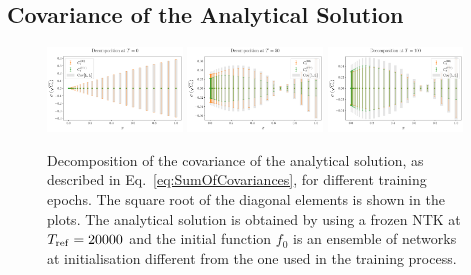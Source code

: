 \FloatBarrier

\subsection{Covariance of the Analytical Solution}
\label{sec:CovarianceAnlyticalSolution}


\begin{figure}[ht!]
  \centering
  \includegraphics[width=0.32\textwidth]{plots/analytical_solution/xT3/covariance/diagonal/decomposition/L0/linear/diag_error_decomposition_epoch_0_L0_linear.pdf}
  \includegraphics[width=0.32\textwidth]{plots/analytical_solution/xT3/covariance/diagonal/decomposition/L0/linear/diag_error_decomposition_epoch_50_L0_linear.pdf}
  \includegraphics[width=0.32\textwidth]{plots/analytical_solution/xT3/covariance/diagonal/decomposition/L0/linear/diag_error_decomposition_epoch_100_L0_linear.pdf}
  \caption{Decomposition of the covariance of the analytical solution, as
  described in Eq.~\eqref{eq:SumOfCovariances}, for different training epochs.
  The square root of the diagonal elements is shown in the plots.
  The analytical solution is obtained by using a frozen NTK at
  $T_{\rm{ref}}=20000$ and the initial function $f_0$ is an ensemble of
  networks at initialisation different from the one used in the training
  process.}
  \label{fig:analytical_covariance_L0}
\end{figure}
